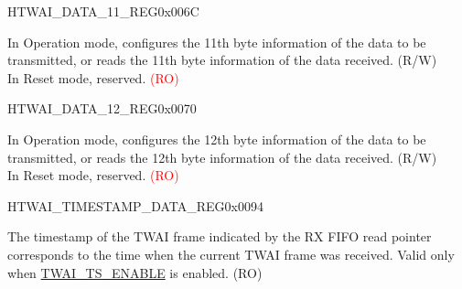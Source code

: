 \begin{register}{H}{TWAI\_DATA\_11\_REG}{0x006C}\label{regdesc:TWAIDATA11REG}
%
%
\regnewline%
\begin{regdesc}\begin{reglist}
\label{fielddesc:TWAIDATA11}\item [TWAI\_DATA\_11] In Operation mode, configures the 11th byte information of the data to be transmitted, or reads the 11th byte information of the data received. (R/W)\\
In Reset mode, reserved. \textcolor{red}{(RO)}
\end{reglist}\end{regdesc}
\end{register}


\begin{register}{H}{TWAI\_DATA\_12\_REG}{0x0070}\label{regdesc:TWAIDATA12REG}
%
%
\regnewline%
\begin{regdesc}\begin{reglist}
\label{fielddesc:TWAIDATA12}\item [TWAI\_DATA\_12] In Operation mode, configures the 12th byte information of the data to be transmitted, or reads the 12th byte information of the data received. (R/W)\\
In Reset mode, reserved. \textcolor{red}{(RO)}
\end{reglist}\end{regdesc}
\end{register}


\begin{register}{H}{TWAI\_TIMESTAMP\_DATA\_REG}{0x0094}\label{regdesc:TWAITIMESTAMPDATAREG}
%
\regnewline%
\begin{regdesc}\begin{reglist}
\label{fielddesc:TWAITIMESTAMPDATA}\item [TWAI\_TIMESTAMP\_DATA] The timestamp of the TWAI frame indicated by the RX FIFO read pointer corresponds to the time when the current TWAI frame was received. Valid only when \hyperref[fielddesc:TWAITSENABLE]{TWAI\_TS\_ENABLE} is enabled. (RO)
\end{reglist}\end{regdesc}
\end{register}


